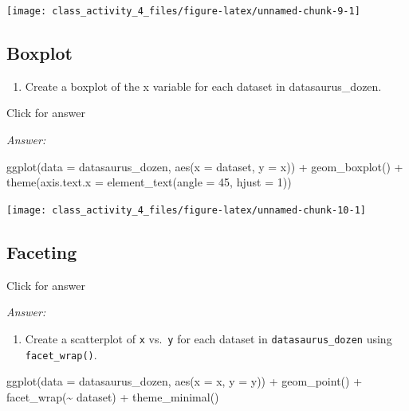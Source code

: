 \documentclass[
]{book}
\newenvironment{Shaded}{\begin{snugshade}}{\end{snugshade}}
\newcommand{\AttributeTok}[1]{\textcolor[rgb]{0.77,0.63,0.00}{#1}}
\newcommand{\DecValTok}[1]{\textcolor[rgb]{0.00,0.00,0.81}{#1}}
\newcommand{\FunctionTok}[1]{\textcolor[rgb]{0.00,0.00,0.00}{#1}}
\newcommand{\NormalTok}[1]{#1}
\newcommand{\SpecialCharTok}[1]{\textcolor[rgb]{0.00,0.00,0.00}{#1}}
\providecommand{\tightlist}{%
  \setlength{\itemsep}{0pt}\setlength{\parskip}{0pt}}
\begin{document}
\texttt{[image: class\_activity\_4\_files/figure-latex/unnamed-chunk-9-1]}

\hypertarget{boxplot}{%
\subsection{Boxplot}\label{boxplot}}

\begin{enumerate}
\def\labelenumi{\alph{enumi}.}
\tightlist
\item
  Create a boxplot of the x variable for each dataset in datasaurus\_dozen.
\end{enumerate}

Click for answer

\emph{Answer:}

\begin{Shaded}
\begin{Highlighting}[]
\FunctionTok{ggplot}\NormalTok{(}\AttributeTok{data =}\NormalTok{ datasaurus\_dozen, }\FunctionTok{aes}\NormalTok{(}\AttributeTok{x =}\NormalTok{ dataset, }\AttributeTok{y =}\NormalTok{ x)) }\SpecialCharTok{+}
  \FunctionTok{geom\_boxplot}\NormalTok{() }\SpecialCharTok{+}
  \FunctionTok{theme}\NormalTok{(}\AttributeTok{axis.text.x =} \FunctionTok{element\_text}\NormalTok{(}\AttributeTok{angle =} \DecValTok{45}\NormalTok{, }\AttributeTok{hjust =} \DecValTok{1}\NormalTok{))}
\end{Highlighting}
\end{Shaded}

\texttt{[image: class\_activity\_4\_files/figure-latex/unnamed-chunk-10-1]}

\hypertarget{faceting}{%
\subsection{Faceting}\label{faceting}}

Click for answer

\emph{Answer:}

\begin{enumerate}
\def\labelenumi{\alph{enumi}.}
\tightlist
\item
  Create a scatterplot of \texttt{x} vs.~\texttt{y} for each dataset in \texttt{datasaurus\_dozen} using \texttt{facet\_wrap()}.
\end{enumerate}

\begin{Shaded}
\begin{Highlighting}[]
\FunctionTok{ggplot}\NormalTok{(}\AttributeTok{data =}\NormalTok{ datasaurus\_dozen, }\FunctionTok{aes}\NormalTok{(}\AttributeTok{x =}\NormalTok{ x, }\AttributeTok{y =}\NormalTok{ y)) }\SpecialCharTok{+}
  \FunctionTok{geom\_point}\NormalTok{() }\SpecialCharTok{+}
  \FunctionTok{facet\_wrap}\NormalTok{(}\SpecialCharTok{\textasciitilde{}}\NormalTok{ dataset) }\SpecialCharTok{+}
  \FunctionTok{theme\_minimal}\NormalTok{()}
\end{Highlighting}
\end{Shaded}
\end{document}

